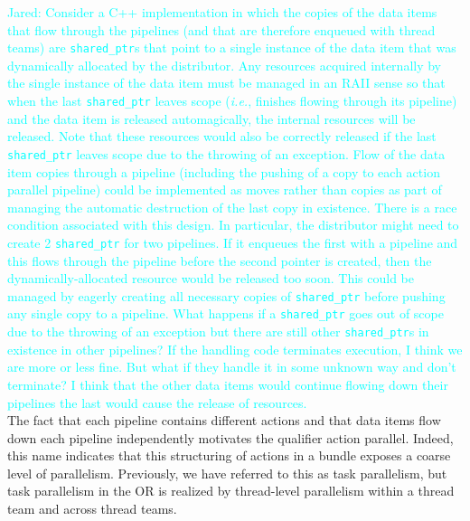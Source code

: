 \documentclass{article}
\newcommand{\code}[1]{{\tt#1}}
\newcommand{\ie}{\textit{i.e.}}   %
\newcommand{\Jared}[1]          {\textcolor{cyan}{Jared: #1}}
\newcommand{\shortOR}   {OR\xspace}
\newcommand{\OR}        {\shortOR}
\begin{document}
\Jared{Consider a C++ implementation in which the copies of the data
items that flow through the pipelines (and that are therefore enqueued with
thread teams) are \code{shared\_ptr}s that point to a single instance of the
data item that was dynamically allocated by the distributor.  Any resources
acquired internally by the single instance of the data item must be managed in
an RAII sense so that when the last \code{shared\_ptr} leaves scope (\ie,
finishes flowing through its pipeline) and the data item is released automagically, the
internal resources will be released.  Note that these resources would also be
correctly released if the last \code{shared\_ptr} leaves scope due to the
throwing of an exception.  Flow of the data item copies through a pipeline
(including the pushing of a copy to each action parallel pipeline) could be
implemented as moves rather than copies as part of managing the automatic
destruction of the last copy in existence.  There is a race condition associated
with this design.  In particular, the distributor might need to create 2
\code{shared\_ptr} for two pipelines.  If it enqueues the first with a pipeline
and this flows through the pipeline before the second pointer is created, then
the dynamically-allocated resource would be released too soon.  This could be
managed by eagerly creating all necessary copies of \code{shared\_ptr} before
pushing any single copy to a pipeline.  What happens if a \code{shared\_ptr}
goes out of scope due to the throwing of an exception but there are still other
\code{shared\_ptr}s in existence in other pipelines?  If the handling code
terminates execution, I think we are more or less fine.  But what if they handle
it in some unknown way and don't terminate?  I think that the other data items
would continue flowing down their pipelines the last would cause the release of
resources.}\\

The fact that each pipeline contains different actions and
that data items flow down each pipeline independently motivates the qualifier
action parallel.  Indeed, this name indicates that this structuring of actions
in a bundle exposes a coarse level of parallelism.  Previously, we have referred
to this as task parallelism, but task parallelism in the \OR is realized by
thread-level parallelism within a thread team and across thread teams.\\
\end{document}

